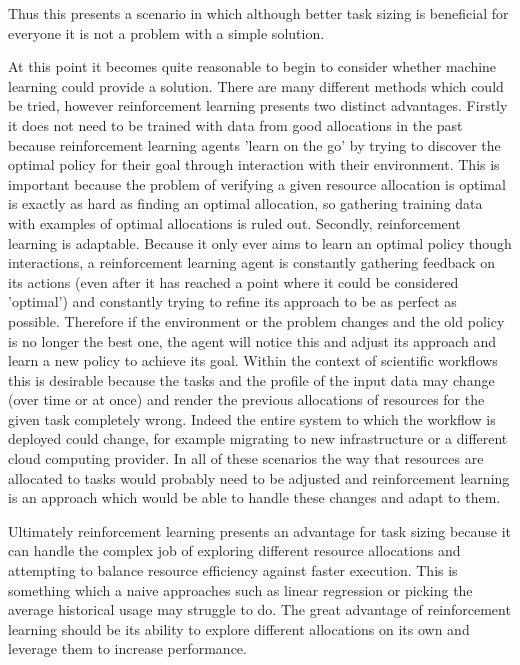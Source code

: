 Thus this presents a scenario in which although better task sizing is beneficial for everyone it is not a problem with a simple solution.

At this point it becomes quite reasonable to begin to consider whether machine learning could provide a solution. There are many different methods which could be tried, however reinforcement learning presents two distinct advantages. Firstly it does not need to be trained with data from good allocations in the past because reinforcement learning agents 'learn on the go' by trying to discover the optimal policy for their goal through interaction with their environment. This is important because the problem of verifying a given resource allocation is optimal is exactly as hard as finding an optimal allocation, so gathering training data with examples of optimal allocations is ruled out. Secondly, reinforcement learning is adaptable. Because it only ever aims to learn an optimal policy though interactions, a reinforcement learning agent is constantly gathering feedback on its actions (even after it has reached a point where it could be considered 'optimal') and constantly trying to refine its approach to be as perfect as possible. Therefore if the environment or the problem changes and the old policy is no longer the best one, the agent will notice this and adjust its approach and learn a new policy to achieve its goal. Within the context of scientific workflows this is desirable because the tasks and the profile of the input data may change (over time or at once) and render the previous allocations of resources for the given task completely wrong. Indeed the entire system to which the workflow is deployed could change, for example migrating to new infrastructure or a different cloud computing provider. In all of these scenarios the way that resources are allocated to tasks would probably need to be adjusted and reinforcement learning is an approach which would be able to handle these changes and adapt to them.

Ultimately reinforcement learning presents an advantage for task sizing because it can handle the complex job of exploring different resource allocations and attempting to balance resource efficiency against faster execution. This is something which a naive approaches such as linear regression or picking the average historical usage may struggle to do. The great advantage of reinforcement learning should be its ability to explore different allocations on its own and leverage them to increase performance.

